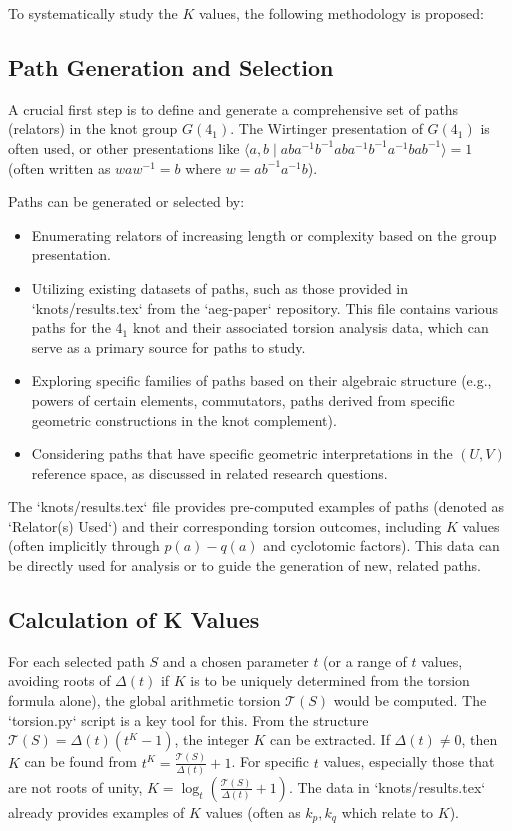\documentclass{article}
\begin{document}
To systematically study the $K$ values, the following methodology is proposed:

\subsection{Path Generation and Selection}
A crucial first step is to define and generate a comprehensive set of paths (relators) in the knot group $G(4_1)$. The Wirtinger presentation of $G(4_1)$ is often used, or other presentations like $\langle a, b \mid aba^{-1}b^{-1}aba^{-1}b^{-1}a^{-1}bab^{-1} \rangle = 1$ (often written as $w a w^{-1} = b$ where $w = a b^{-1} a^{-1} b$).

Paths can be generated or selected by:
\begin{itemize}
    \item Enumerating relators of increasing length or complexity based on the group presentation.
    \item Utilizing existing datasets of paths, such as those provided in `knots/results.tex` from the `aeg-paper` repository. This file contains various paths for the $4_1$ knot and their associated torsion analysis data, which can serve as a primary source for paths to study.
    \item Exploring specific families of paths based on their algebraic structure (e.g., powers of certain elements, commutators, paths derived from specific geometric constructions in the knot complement).
    \item Considering paths that have specific geometric interpretations in the $(U,V)$ reference space, as discussed in related research questions.
\end{itemize}

The `knots/results.tex` file provides pre-computed examples of paths (denoted as `Relator(s) Used`) and their corresponding torsion outcomes, including $K$ values (often implicitly through $p(a)-q(a)$ and cyclotomic factors). This data can be directly used for analysis or to guide the generation of new, related paths.

\subsection{Calculation of K Values}
For each selected path $S$ and a chosen parameter $t$ (or a range of $t$ values, avoiding roots of $\Delta(t)$ if $K$ is to be uniquely determined from the torsion formula alone), the global arithmetic torsion $\mathcal{T}(S)$ would be computed. The `torsion.py` script is a key tool for this. From the structure $\mathcal{T}(S) = \Delta(t)(t^K-1)$, the integer $K$ can be extracted. If $\Delta(t) \neq 0$, then $K$ can be found from $t^K = \frac{\mathcal{T}(S)}{\Delta(t)} + 1$. For specific $t$ values, especially those that are not roots of unity, $K = \log_t \left( \frac{\mathcal{T}(S)}{\Delta(t)} + 1 \right)$. The data in `knots/results.tex` already provides examples of $K$ values (often as $k_p, k_q$ which relate to $K$).
\end{document}
